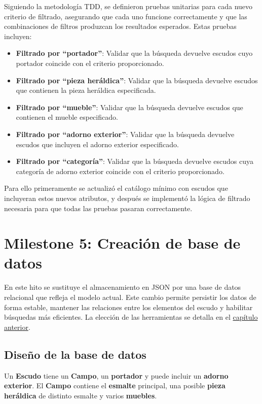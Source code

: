 Siguiendo la metodología TDD, se definieron pruebas unitarias para cada nuevo criterio de filtrado,
asegurando que cada uno funcione correctamente y que las combinaciones de filtros produzcan los
resultados esperados. Estas pruebas incluyen:
\begin{itemize}
    \item \textbf{Filtrado por ``portador''}: Validar que la búsqueda devuelve escudos cuyo portador coincide
        con el criterio proporcionado.
    \item \textbf{Filtrado por ``pieza heráldica''}: Validar que la búsqueda devuelve escudos que contienen
        la pieza heráldica especificada.
    \item \textbf{Filtrado por ``mueble''}: Validar que la búsqueda devuelve escudos que contienen el mueble
        especificado.
    \item \textbf{Filtrado por ``adorno exterior''}: Validar que la búsqueda devuelve escudos que incluyen
        el adorno exterior especificado.
    \item \textbf{Filtrado por ``categoría''}: Validar que la búsqueda devuelve escudos cuya categoría de
        adorno exterior coincide con el criterio proporcionado.
\end{itemize}

Para ello primeramente se actualizó el catálogo mínimo con escudos que incluyeran
estos nuevos atributos, y después se implementó la lógica de filtrado necesaria para que todas las
pruebas pasaran correctamente.

\section{Milestone 5: Creación de base de datos}
En este hito se sustituye el almacenamiento en JSON por una base de datos relacional que refleja el modelo actual. 
Este cambio permite persistir los datos de forma estable, mantener las relaciones entre los elementos del escudo y 
habilitar búsquedas más eficientes. La elección de las herramientas se detalla en el \hyperref[sec:base-datos]{capítulo anterior}.

\subsection{Diseño de la base de datos}
Un \textbf{Escudo} tiene un \textbf{Campo}, un \textbf{portador} y puede incluir un \textbf{adorno exterior}. 
El \textbf{Campo} contiene el \textbf{esmalte} principal, una posible \textbf{pieza heráldica} de distinto esmalte 
y varios \textbf{muebles}.

